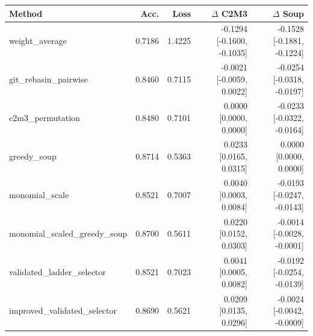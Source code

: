 \begin{tabular}{lrrrr}
\toprule
Method & Acc. & Loss & $\Delta$ C2M3 & $\Delta$ Soup \\
\midrule
weight\_average & 0.7186 & 1.4225 & -0.1294 [-0.1600, -0.1035] & -0.1528 [-0.1881, -0.1224] \\
git\_rebasin\_pairwise & 0.8460 & 0.7115 & -0.0021 [-0.0059, 0.0022] & -0.0254 [-0.0318, -0.0197] \\
c2m3\_permutation & 0.8480 & 0.7101 & 0.0000 [0.0000, 0.0000] & -0.0233 [-0.0322, -0.0164] \\
greedy\_soup & 0.8714 & 0.5363 & 0.0233 [0.0165, 0.0315] & 0.0000 [0.0000, 0.0000] \\
monomial\_scale & 0.8521 & 0.7007 & 0.0040 [0.0003, 0.0084] & -0.0193 [-0.0247, -0.0143] \\
monomial\_scaled\_greedy\_soup & 0.8700 & 0.5611 & 0.0220 [0.0152, 0.0303] & -0.0014 [-0.0028, -0.0001] \\
validated\_ladder\_selector & 0.8521 & 0.7023 & 0.0041 [0.0005, 0.0082] & -0.0192 [-0.0254, -0.0139] \\
improved\_validated\_selector & 0.8690 & 0.5621 & 0.0209 [0.0135, 0.0296] & -0.0024 [-0.0042, -0.0009] \\
\bottomrule
\end{tabular}
